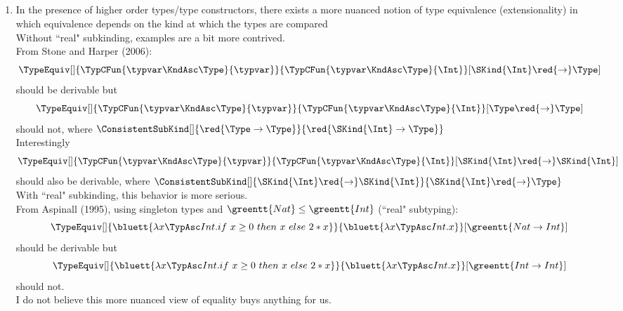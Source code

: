 \documentclass[12pt,fleqn]{article}
\begin{document}
    \subsection*{}
    \begin{enumerate}[label=Nibwm \arabic*:]
        \item In the presence of higher order types/type constructors, there exists a more nuanced notion of type equivalence (extensionality) in which equivalence depends on the kind at which the types are compared \\
            Without ``real" subkinding, examples are a bit more contrived. \\
            From Stone and Harper (2006): \\
            \[
                \TypeEquiv[]{\TypCFun{\typvar\KndAsc\Type}{\typvar}}{\TypCFun{\typvar\KndAsc\Type}{\Int}}[\SKind{\Int} \red{\rightarrow} \Type]
            \]
            should be derivable but
            \[
                \TypeEquiv[]{\TypCFun{\typvar\KndAsc\Type}{\typvar}}{\TypCFun{\typvar\KndAsc\Type}{\Int}}[\Type \red{\rightarrow} \Type]
            \]
            should not, where $\ConsistentSubKind[]{\red{\Type \rightarrow \Type}}{\red{\SKind{\Int} \rightarrow \Type}}$ \\
            Interestingly
            \[
                \TypeEquiv[]{\TypCFun{\typvar\KndAsc\Type}{\typvar}}{\TypCFun{\typvar\KndAsc\Type}{\Int}}[\SKind{\Int} \red{\rightarrow} \SKind{\Int}]
            \]
            should also be derivable, where $\ConsistentSubKind[]{\SKind{\Int} \red{\rightarrow} \SKind{\Int}}{\SKind{\Int} \red{\rightarrow} \Type}$ \\
            With ``real" subkinding, this behavior is more serious. \\
            From Aspinall (1995), using singleton types and $\greentt{Nat} \le \greentt{Int}$ (``real" subtyping):
            \[
                \TypeEquiv[]{\bluett{\lambda x\TypAsc Int.if~x \ge 0~then~x~else~2*x}}{\bluett{\lambda x\TypAsc Int.x}}[\greentt{Nat \rightarrow Int}]
            \]
            should be derivable but
            \[
                \TypeEquiv[]{\bluett{\lambda x\TypAsc Int.if~x \ge 0~then~x~else~2*x}}{\bluett{\lambda x\TypAsc Int.x}}[\greentt{Int \rightarrow Int}]
            \]
            should not. \\
            I do not believe this more nuanced view of equality buys anything for us.
    \end{enumerate}
\newpage
    
    
\end{document}
